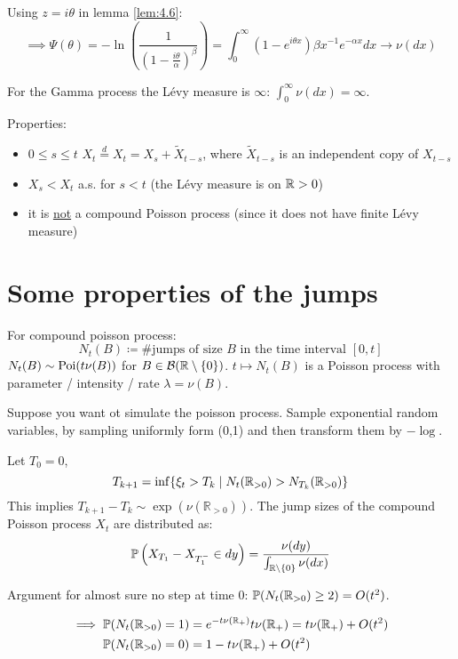 Using $z=i\theta$ in lemma \ref{lem:4.6}:
\[\implies \Psi(\theta)=-\ln\left(\frac{1}{(1-\frac{i\theta}{\alpha})^\beta}\right)=\int_0^\infty (1-e^{i\theta x})\beta x^{-1}e^{-\alpha x}dx\to \nu(dx)\]

\begin{aremark}
    For the Gamma process the Lévy measure is $\infty$: $\int_0^\infty \nu(dx)=\infty$.
\end{aremark}

Properties: 
\begin{itemize}
    \item $0\leq s\leq t$ $X_t\stackrel{d}{=}X_t=X_s+\tilde{X}_{t-s}$, where $\tilde{X}_{t-s}$ is an independent copy of $X_{t-s}$
    \item $X_s<X_t$ a.s. for $s<t$ (the Lévy measure is on $\mathbb{R}>0$)
    \item it is \underline{not} a compound Poisson process (since it does not have finite Lévy measure) 
\end{itemize}

\section{Some properties of the jumps}

For compound poisson process:
\[N_t(B)\coloneqq \text{\# jumps of size }B \text{ in the time interval }[0,t]\]
$N_t(B)\sim\text{Poi}(t\nu(B))$ for $B\in \mathcal{B}(\mathbb{R}\setminus\{0\})$. $t\mapsto N_t(B)$ is a Poisson process
with parameter / intensity / rate $\lambda=\nu(B)$.

\begin{aremark}
    Suppose you want ot simulate the poisson process. Sample exponential random variables, by sampling uniformly form (0,1) and then transform them by $-\log$.
\end{aremark}

Let $T_0=0$, \[T_{k+1}=\inf\{\xi_t>T_k\mid N_t(\mathbb{R}_{>0})>N_{T_k}(\mathbb{R}_{>0})\}\]
This implies $T_{k+1}-T_k\sim\exp(\nu(\mathbb{R}_{> 0}))$. The jump sizes of the 
compound Poisson process $X_t$ are distributed as:
\[\mathbb{P}\left(X_{T_1}-X_{T_1^-}\in dy\right)=\frac{\nu(dy)}{\int_{\mathbb{R}\setminus\{0\}} \nu(dx)}\]

Argument for almost sure no step at time $0$: $\mathbb{P}(N_t(\mathbb{R}_{>0})\geq 2)=O(t^2)$.

\begin{align*}
    \implies \mathbb{P}(N_t(\mathbb{R}_{>0})=1)&=e^{-t\nu(\mathbb{R}_+)}t\nu(\mathbb{R}_+)=t\nu(\mathbb{R}_+)+O(t^2)\\
    \mathbb{P}(N_t(\mathbb{R}_{>0})=0)&=1-t\nu(\mathbb{R}_+)+O(t^2)
\end{align*}

